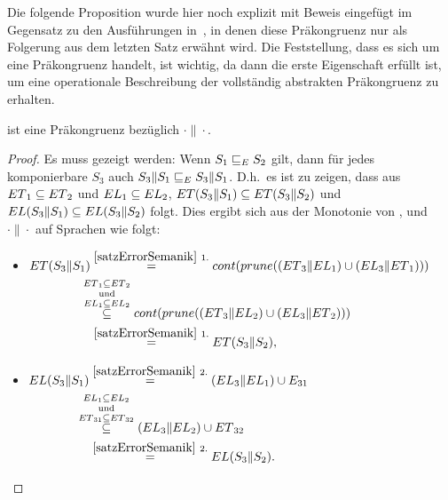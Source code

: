 Die folgende Proposition wurde hier noch explizit mit Beweis eingefügt im
Gegensatz zu den Ausführungen in~\cite{Vogler2014EIO}, in denen diese
Präkongruenz nur als Folgerung aus dem letzten Satz erwähnt wird. Die
Feststellung, dass es sich um eine Präkongruenz handelt, ist wichtig, da
dann die erste Eigenschaft erfüllt ist, um eine operationale Beschreibung der
vollständig abstrakten Präkongruenz \ECRel{} zu erhalten.

\begin{prop}
  \label{propPraekongruenz}
  \ERel{} ist eine Präkongruenz bezüglich $\cdot\|\cdot$.
\end{prop}

\begin{proof}
  Es muss gezeigt werden: Wenn $S_1\sqsubseteq _E S_2$ gilt, dann für jedes
  komponierbare $S_3$ auch $S_3\|S_1\sqsubseteq _E S_3\|S_1$. D.h.\ es ist zu zeigen,
  dass aus $ET{}_1\subseteq ET{}_2$ und $EL{}_1\subseteq EL{}_2$,
  $ET{}(S_3\|S_1)\subseteq ET{}(S_3\|S_2)$ und $EL{}(S_3\|S_1)\subseteq
  EL{}(S_3\|S_2)$ folgt. Dies ergibt sich aus der Monotonie von \cont{},
  \prune{} und $\cdot \|\cdot$ auf Sprachen wie folgt:\\
  \begin{itemize}
    \item $\begin{aligned}[t]
        \ET{}(S_3\|S_1) &\overset{\ref{satzErrorSemanik}~1.}{=}
      \cont{}(\prune{}((\ET{}_3\|\EL{}_1)\cup (\EL{}_3\|\ET{}_1)))\\
      &\hspace{-0.3cm}\overset{\ET{}_1\subseteq
    \ET{}_2}{\overset{\mathrm{und}}{\overset{\EL{}_1\subseteq \EL{}_2}{\subseteq}}}
    \cont{}(\prune{}((\ET{}_3\|\EL{}_2)\cup (\EL{}_3\|\ET{}_2)))\\
      &\overset{\ref{satzErrorSemanik}~1.}{=} \ET{}(S_3\|S_2),
    \end{aligned}$
    \item $\begin{aligned}[t]
        \EL{}(S_3\|S_1) &\overset{\ref{satzErrorSemanik}~2.}{=} (\EL{}_3\|\EL{}_1)\cup
        E_{31}\\
        &\hspace{-0.4cm}\overset{\EL{}_1\subseteq
      \EL{}_2}{\overset{\mathrm{und}}{\overset{\ET{}_{31}\subseteq
      \ET{}_{32}}{\subseteq}}} (\EL{}_3\|\EL{}_2)\cup \ET{}_{32}\\
      &\overset{\ref{satzErrorSemanik}~2.}{=} \EL{}(S_3\|S_2).
    \end{aligned}$
  \end{itemize}
\end{proof}

